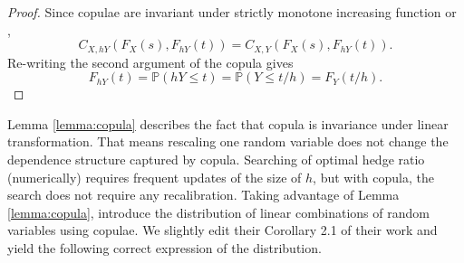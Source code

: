 \begin{proof}
  Since copulae are invariant under strictly monotone increasing
  function \citet[Theorem 3 (i)]{schweizer1981nonparametric} or
  \citet[Theorem 2.4.3]{Nelsen1999}, 
  \begin{equation*}
    C_{X, hY}\left(F_X(s),F_{hY}(t)\right) = C_{X, Y}\left(F_X(s),F_{hY}(t)\right).
    \end{equation*}
Re-writing the second argument of the copula gives
\begin{equation*}
  F_{hY}(t) = \mathbb{P}(hY \leq t)
  = \mathbb{P}(Y \leq t/h)
  = F_Y(t/h).
\end{equation*}
\end{proof}


Lemma \ref{lemma:copula} describes the fact that copula is invariance under linear transformation.
That means rescaling one random variable does not change the dependence structure captured by copula. 
Searching of optimal hedge ratio (numerically) requires frequent updates of the size of $h$,
but with copula, the search does not require any recalibration.
Taking advantage of Lemma \ref{lemma:copula}, \citet{barbi2014copula}
introduce the distribution of linear combinations of random variables
using copulae. 
We slightly edit their Corollary 2.1 of their work and yield the 
following correct expression of the distribution. 

